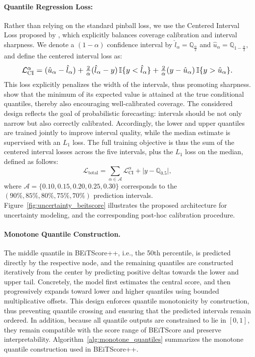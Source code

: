\documentclass[11pt]{article}
\begin{document}
\paragraph{Quantile Regression Loss:} Rather than relying on the standard pinball loss, we use the Centered Interval Loss proposed by \citet{chung2021beyond}, which explicitly balances coverage calibration and interval sharpness. We denote a $(1-\alpha)$ confidence interval by $\hat{l}_{\alpha} = \mathbb{Q}_{\frac{\alpha}{2}}$ and $\hat{u}_{\alpha} = \mathbb{Q}_{1-\frac{\alpha}{2}}$, and define the centered interval loss as:
\begin{equation}
\resizebox{0.89\columnwidth}{!}{$
    \mathcal{L}^\alpha_{\text{CI}} = (\hat{u}_\alpha - \hat{l}_\alpha) + \frac{2}{\alpha}(\hat{l}_\alpha - y)\,\mathbb{I}\{y < \hat{l}_\alpha\} + \frac{2}{\alpha}(y - \hat{u}_\alpha)\,\mathbb{I}\{y > \hat{u}_\alpha\}.
$}
\end{equation}
This loss explicitly penalizes the width of the intervals, thus promoting sharpness. \citet{chung2021beyond} show that the minimum of its expected value is attained at the true conditional quantiles, thereby also encouraging well-calibrated coverage. The considered design reflects the goal of probabilistic forecasting: intervals should be not only narrow but also correctly calibrated. Accordingly, the lower and upper quantiles are trained jointly to improve interval quality, while the median estimate is supervised with an $L_1$ loss. The full training objective is thus the sum of the centered interval losses across the five intervals, plus the $L_1$ loss on the median, defined as follows: 
\begin{equation}
\mathcal{L}_{\text{total}} 
= \sum_{\alpha \in \mathcal{A}} \mathcal{L}^\alpha_{\text{CI}}
  +  \bigl| y - \mathbb{Q}_{0.5} \bigr|,
\end{equation}
where $\mathcal{A} = \{0.10, 0.15, 0.20, 0.25, 0.30\}$ corresponds to the $(90\%, 85\%, 80\%, 75\%, 70\%)$ prediction intervals. Figure~\ref{fig:uncertainty_beitscore} illustrates the proposed architecture for uncertainty modeling, and the corresponding post-hoc calibration procedure.

\paragraph{Monotone Quantile Construction.} The middle quantile in BEiTScore++, i.e., the 50th percentile, is predicted directly by the respective node, and the remaining quantiles are constructed iteratively from the center by predicting positive deltas towards the lower and upper tail. Concretely, the model first estimates the central score, and then progressively expands toward lower and higher quantiles using bounded multiplicative offsets. This design enforces quantile monotonicity by construction, thus preventing quantile crossing and ensuring that the predicted intervals remain ordered. In addition, because all quantile outputs are constrained to lie in \([0,1]\), they remain compatible with the score range of BEiTScore and preserve interpretability. Algorithm~\ref{alg:monotone_quantiles} summarizes the monotone quantile construction used in BEiTScore++.
\end{document}
